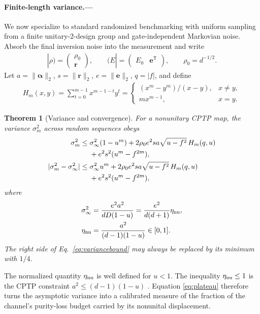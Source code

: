 \documentclass[aps,prl,reprint,superscriptaddress,nofootinbib]{revtex4-2}
\newtheorem{theorem}{Theorem}
\begin{document}
\paragraph{Finite-length variance.---}
We now specialize to standard randomized benchmarking with uniform sampling
from a finite unitary-$2$-design group and gate-independent Markovian noise.
Absorb the final inversion noise into the measurement and write
\begin{align}
 |\rho)=\begin{pmatrix}\rho_0\\ \bm r\end{pmatrix},\qquad
 (E|=\begin{pmatrix}E_0&\bm e^{\mathsf T}\end{pmatrix},
 \qquad \rho_0=d^{-1/2}.
\end{align}
Let $a=\lVert\bm\alpha\rVert_2$, $s=\lVert\bm r\rVert_2$,
$e=\lVert\bm e\rVert_2$, $q=|f|$, and define
\begin{align}
 H_m(x,y)=\sum_{t=0}^{m-1}x^{m-1-t}y^t
 =\begin{cases}
 (x^m-y^m)/(x-y),&x\neq y,\\
 mx^{m-1},&x=y.
 \end{cases}
 \label{eq:Hm}
\end{align}

\begin{theorem}[Variance and convergence]
For a nonunitary CPTP map, the variance $\sigma_m^2$ across random sequences
obeys
\begin{align}
 \sigma_m^2 \leq{}& \sigma_\infty^2(1-u^m)
 +2\rho_0e^2sa\sqrt{u-f^2}\,H_m(q,u)
 \notag\\
 &+e^2s^2(u^m-f^{2m}),
 \label{eq:variancebound}\\
 |\sigma_m^2-\sigma_\infty^2|\leq{}&\sigma_\infty^2u^m
 +2\rho_0e^2sa\sqrt{u-f^2}\,H_m(q,u)
 \notag\\
 &+e^2s^2(u^m-f^{2m}),
 \label{eq:convergencebound}
\end{align}
where
\begin{align}
 \sigma_\infty^2
 &=\frac{e^2a^2}{dD(1-u)}
 =\frac{e^2}{d(d+1)}\eta_{\rm nu},\notag\\
 \eta_{\rm nu}&=\frac{a^2}{(d-1)(1-u)}\in[0,1].
 \label{eq:plateau}
\end{align}
The right side of Eq.~\eqref{eq:variancebound} may always be replaced by its
minimum with $1/4$.
\end{theorem}

The normalized quantity $\eta_{\rm nu}$ is well defined for $u<1$.
The inequality $\eta_{\rm nu}\leq1$ is the CPTP constraint
$a^2\leq(d-1)(1-u)$ \cite{WallmanEtAl2015}.  Equation
\eqref{eq:plateau} therefore turns the asymptotic variance into a calibrated
measure of the fraction of the channel's purity-loss budget carried by its
nonunital displacement.
\end{document}
